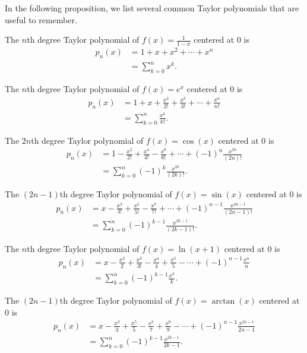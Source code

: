 \documentclass{ximera}
\begin{document}
In the following proposition, we list several common Taylor polynomials that are useful to remember.

\begin{proposition}
The $n$th degree Taylor polynomial of $f(x) = \frac{1}{1-x}$ centered at $0$ is
\begin{align*}
p_n(x) &= 1 + x + x^2 + \cdots + x^n\\
&= \sum_{k=0}^n x^k.
\end{align*}

The $n$th degree Taylor polynomial of $f(x) = e^x$ centered at $0$ is
\begin{align*}
p_n(x) &= 1 + x + \frac{x^2}{2!} +\frac{x^3}{3!} + \cdots + \frac{x^n}{n!}\\
&= \sum_{k=0}^{n}\frac{x^k}{k!}.
\end{align*}

The $2n$th degree Taylor polynomial of $f(x) = \cos(x)$ centered at $0$ is
\begin{align*}
p_n(x) &= 1 - \frac{x^2}{2!} +\frac{x^4}{4!} - \frac{x^6}{6!} + \cdots + (-1)^n\frac{x^{2n}}{(2n)!}\\
&= \sum_{k=0}^{n} (-1)^k\frac{x^{2k}}{(2k)!}.
\end{align*}

The $(2n-1)$th degree Taylor polynomial of $f(x) = \sin(x)$ centered at $0$ is
\begin{align*}
p_n(x) &= x - \frac{x^3}{3!} +\frac{x^5}{5!} - \frac{x^7}{7!} + \cdots + (-1)^{n-1}\frac{x^{2n-1}}{(2n-1)!}\\
&= \sum_{k=0}^{n} (-1)^{k-1}\frac{x^{2k-1}}{(2k-1)!}.
\end{align*}

The $n$th degree Taylor polynomial of $f(x) = \ln(x+1)$ centered at $0$ is
\begin{align*}
p_n(x) &= x - \frac{x^2}{2} +\frac{x^3}{3!} - \frac{x^4}{4} + \frac{x^5}{5} - \cdots + (-1)^{n-1}\frac{x^n}{n}\\
&= \sum_{k=0}^{n}(-1)^{k-1}\frac{x^k}{k}.
\end{align*}

The $(2n-1)$th degree Taylor polynomial of $f(x) = \arctan(x)$ centered at $0$ is
\begin{align*}
p_n(x) &= x - \frac{x^3}{3} +\frac{x^5}{5} - \frac{x^7}{7} + \frac{x^9}{9} - \cdots + (-1)^{n-1}\frac{x^{2n-1}}{2n-1}\\
&= \sum_{k=0}^{n}(-1)^{k-1}\frac{x^{2k-1}}{2k-1}.
\end{align*}
\end{proposition}
\end{document}
